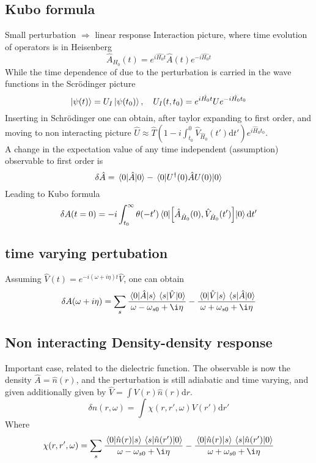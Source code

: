 \documentclass{article}
\begin{document}
\subsection{Kubo formula}
Small perturbation $\Rightarrow$ linear response
Interaction picture, where time evolution of operators is in Heisenberg
\begin{equation}
    \hat{A}_{H_0}(t) = e^{i \hat{H_0} t} \hat{A}(t) e^{-i \hat{H_0} t}
\end{equation}
While the time dependence of due to the perturbation is carried in the wave functions in the Scrödinger picture
\begin{equation}
    \ket{\psi(t)} = U_I \ket{\psi(t_0)}, \quad U_I(t,t_0) = e^{i \hat{H_0} t} U e^{-i \hat{H_0} t_0}
\end{equation}
Inserting in Schrödinger one can obtain, after taylor expanding to first order, and moving to non interacting picture $\hat{U} \approx \hat{T}(1-i\int_{t_0}^0 \hat{V}_{\hat{H}_0}(t')\mathrm{d}t') e^{i \hat{H}_0 t_0}$. \\
A change in the expectation value of any time independent (assumption) observable to first order is
\begin{equation}
    \delta \hat{A} = \mel{0}{\hat{A}}{0} - \mel{0}{U^{\dagger}(0)\hat{A}U(0)}{0}
\end{equation}
Leading to Kubo formula
\begin{equation}
    \delta A(t=0) = -i \int_{t_0}^{\infty} \theta(-t') \mel{0}{\comm{\hat{A}_{\hat{H}_0}(0)}{\hat{V}_{\hat{H}_0}(t')}}{0} \mathrm{d} t'
\end{equation}
\subsection{time varying pertubation}
Assuming $\hat{V}(t) = e^{-i(\omega + i \eta)t} \hat{V}$, one can obtain
\begin{equation}
    \delta A(\omega + i \eta) = \sum_s \frac{\mel{0}{\hat{A}}{s} \mel{s}{\hat{V}}{0}}{\omega - \omega_{s0} + \i \eta} -  \frac{\mel{0}{\hat{V}}{s} \mel{s}{\hat{A}}{0}}{\omega + \omega_{s0} + \i \eta}
\end{equation}
\subsection{Non interacting Density-density response}
Important case, related to the dielectric function. The observable is now the density $\hat{A} = \hat{n}(r)$, and the perturbation is still adiabatic and time varying, and given additionally given by $\hat{V} = \int V(r) \hat{n}(r) \mathrm{d}r$. 
\begin{equation}
    \delta n(r, \omega) = \int \chi(r,r',\omega) V(r') \mathrm{d}r'
\end{equation}
Where
\begin{equation}
    \chi(r,r',\omega) = \sum_s \frac{\mel{0}{\hat{n}(r)}{s} \mel{s}{\hat{n}(r')}{0} }{\omega - \omega_{s0} + \i \eta} - \frac{\mel{0}{\hat{n}(r)}{s} \mel{s}{\hat{n}(r')}{0}}{\omega + \omega_{s0} + \i \eta}
\end{equation}
\end{document}
